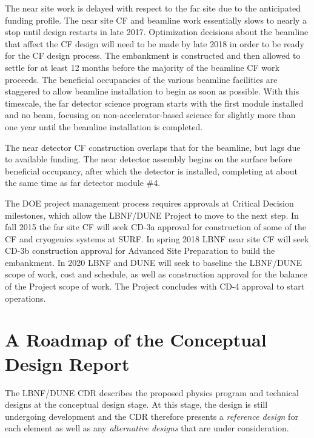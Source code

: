The near site work is delayed with respect to the far site due to the anticipated funding profile. The near site CF and beamline work essentially slows to nearly a stop %
until design restarts in late 2017. Optimization decisions about the beamline that affect the CF design will need to be made by late 2018 in order to be ready for the CF design process. The embankment is constructed and then allowed to settle for at least 12 months before the majority of the beamline CF work proceeds. The beneficial occupancies of the various beamline facilities %
are staggered to allow beamline installation to begin as soon as possible. With this timescale, the far detector science program %
starts with the first module installed and no beam, focusing on non-accelerator-based science %
for slightly more than one year until 
the beamline installation is completed.


The near detector CF construction overlaps that for the beamline, but lags due to available funding. The near detector assembly begins on the surface before beneficial occupancy, after which the detector is installed, completing at about the same time as far detector module \#4. 

The DOE project management process requires approvals at Critical Decision milestones, which allow the LBNF/DUNE Project to move to the next step. In fall 2015 the far site CF will seek CD-3a approval for construction of some of the CF and cryogenics systems at SURF. In spring 2018 LBNF near site CF will seek CD-3b construction approval for Advanced Site Preparation to build the embankment. In 2020 LBNF and DUNE will seek to baseline the LBNF/DUNE scope of work, cost and schedule, as well as construction approval for the balance of the Project scope of work. 
The Project concludes with CD-4 approval to start operations.

\section{A Roadmap of the Conceptual Design Report}

The LBNF/DUNE CDR describes the proposed physics program and 
technical designs at the conceptual design stage.  At this stage, the design is
still undergoing development and the CDR therefore presents a \textit{reference design} for each element as well as any 
\textit{alternative designs} that are under consideration.


